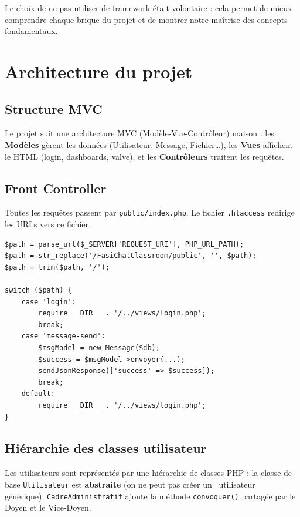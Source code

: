 \documentclass[12pt,a4paper]{article}
\begin{document}
\noindent Le choix de ne pas utiliser de framework \'etait volontaire : cela
permet de mieux comprendre chaque brique du projet et de montrer notre
ma\^itrise des concepts fondamentaux.

\section{Architecture du projet}

\subsection{Structure MVC}

Le projet suit une architecture MVC (Mod\`ele-Vue-Contr\^oleur) maison : les
\textbf{Mod\`eles} g\`erent les donn\'ees (Utilisateur, Message, Fichier\ldots),
les \textbf{Vues} affichent le HTML (login, dashboards, valve), et les
\textbf{Contr\^oleurs} traitent les requ\^etes.

\subsection{Front Controller}

Toutes les requ\^etes passent par \texttt{public/index.php}. Le fichier
\texttt{.htaccess} redirige les URLs vers ce fichier.

\begin{lstlisting}[style=phpphp, caption=Le routeur (public/index.php)]
$path = parse_url($_SERVER['REQUEST_URI'], PHP_URL_PATH);
$path = str_replace('/FasiChatClassroom/public', '', $path);
$path = trim($path, '/');

switch ($path) {
    case 'login':
        require __DIR__ . '/../views/login.php';
        break;
    case 'message-send':
        $msgModel = new Message($db);
        $success = $msgModel->envoyer(...);
        sendJsonResponse(['success' => $success]);
        break;
    default:
        require __DIR__ . '/../views/login.php';
}
\end{lstlisting}

\subsection{Hi\'erarchie des classes utilisateur}

Les utilisateurs sont repr\'esent\'es par une hi\'erarchie de classes PHP :
la classe de base \texttt{Utilisateur} est \textbf{abstraite} (on ne peut pas
cr\'eer un \guillemotleft~utilisateur~\guillemotright{} g\'en\'erique).
\texttt{CadreAdministratif} ajoute la m\'ethode \texttt{convoquer()} partag\'ee
par le Doyen et le Vice-Doyen.
\end{document}
